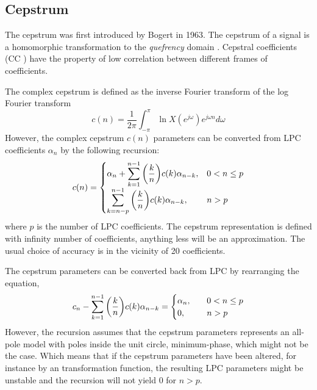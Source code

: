 \subsection{Cepstrum} %
\label{sub:cepstrum}
The cepstrum was first introduced by Bogert \etal \cite{bogert63} in 1963. The cepstrum of a signal is a homomorphic transformation to the \emph{quefrency} domain \cite{taletek}. Cepstral coefficients (CC ) have the property of low correlation between different frames of coefficients.

The complex cepstrum is defined as the inverse Fourier transform of the log Fourier transform
\begin{equation}
	c(n) = \frac{1}{2\pi}\int_{-\pi}^{\pi} \ln X(e^{j\omega}) e^{j\omega n}d\omega
	\label{eq:complex_cepstrum}
\end{equation}
However, the complex cepstrum $c(n)$ parameters can be converted from LPC coefficients $\alpha_n$ by the following recursion:
\begin{equation}
	c(n) = \begin{cases}
		\alpha_n+{\displaystyle\sum_{k=1}^{n-1} \left(\frac{k}{n}\right)} c(k) \alpha_{n-k}, & 0<n\leq p\\
		{\displaystyle\sum_{k=n-p}^{n-1} \left(\frac{k}{n}\right)} c(k) \alpha_{n-k}, & n > p\\
	\end{cases}
	\label{eq:ar2cc}
\end{equation}
where $p$ is the number of LPC coefficients. The cepstrum representation is defined with infinity number of coefficients, anything less will be an approximation. The usual choice of accuracy is in the vicinity of 20 coefficients.

The cepstrum parameters can be converted back from LPC by rearranging the equation,
\begin{equation}
	c_n-{\displaystyle\sum_{k=1}^{n-1} \left(\frac{k}{n}\right)} c(k) \alpha_{n-k} = \begin{cases}
		\alpha_n, &\quad 0< n \leq p\\
		0, &\quad n > p
	\end{cases}
	\label{eq:cc2ar}
\end{equation}
However, the recursion assumes that the cepstrum parameters represents an all-pole model with poles inside the unit circle, minimum-phase, which might not be the case. Which means that if the cepstrum parameters have been altered, for instance by an transformation function, the resulting LPC parameters might be unstable and the recursion will not yield 0 for $n>p$.  

